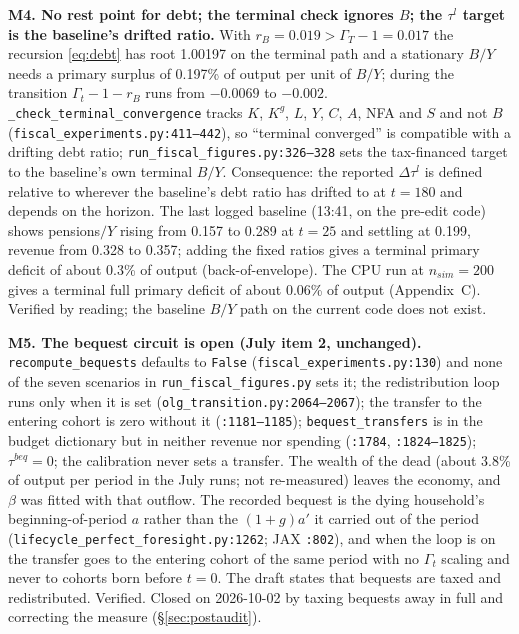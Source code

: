 \documentclass[11pt,a4paper]{article}
\newcommand{\code}[1]{\texttt{#1}}
\begin{document}
\textbf{M4. No rest point for debt; the terminal check ignores $B$; the $\tau^l$ target is the baseline's drifted ratio.} With $r_B = 0.019 > \Gamma_T - 1 = 0.017$ the recursion \eqref{eq:debt} has root 1.00197 on the terminal path and a stationary $B/Y$ needs a primary surplus of 0.197\% of output per unit of $B/Y$; during the transition $\Gamma_t - 1 - r_B$ runs from $-0.0069$ to $-0.002$. \code{_check_terminal_convergence} tracks $K$, $K^g$, $L$, $Y$, $C$, $A$, NFA and $S$ and not $B$ (\code{fiscal_experiments.py:411--442}), so ``terminal converged'' is compatible with a drifting debt ratio; \code{run_fiscal_figures.py:326--328} sets the tax-financed target to the baseline's own terminal $B/Y$. Consequence: the reported $\Delta\tau^l$ is defined relative to wherever the baseline's debt ratio has drifted to at $t = 180$ and depends on the horizon. The last logged baseline (13:41, on the pre-edit code) shows pensions$/Y$ rising from 0.157 to 0.289 at $t = 25$ and settling at 0.199, revenue from 0.328 to 0.357; adding the fixed ratios gives a terminal primary deficit of about 0.3\% of output (back-of-envelope). The CPU run at $n_{sim} = 200$ gives a terminal full primary deficit of about 0.06\% of output (Appendix~C). Verified by reading; the baseline $B/Y$ path on the current code does not exist.

\textbf{M5. The bequest circuit is open (July item 2, unchanged).} \code{recompute_bequests} defaults to \code{False} (\code{fiscal_experiments.py:130}) and none of the seven scenarios in \code{run_fiscal_figures.py} sets it; the redistribution loop runs only when it is set (\code{olg_transition.py:2064--2067}); the transfer to the entering cohort is zero without it (\code{:1181--1185}); \code{bequest_transfers} is in the budget dictionary but in neither revenue nor spending (\code{:1784}, \code{:1824--1825}); $\tau^{beq} = 0$; the calibration never sets a transfer. The wealth of the dead (about 3.8\% of output per period in the July runs; not re-measured) leaves the economy, and $\beta$ was fitted with that outflow. The recorded bequest is the dying household's beginning-of-period $a$ rather than the $(1+g)a'$ it carried out of the period (\code{lifecycle_perfect_foresight.py:1262}; JAX \code{:802}), and when the loop is on the transfer goes to the entering cohort of the same period with no $\Gamma_t$ scaling and never to cohorts born before $t = 0$. The draft states that bequests are taxed and redistributed. Verified. Closed on 2026-10-02 by taxing bequests away in full and correcting the measure (\S\ref{sec:postaudit}).
\end{document}
